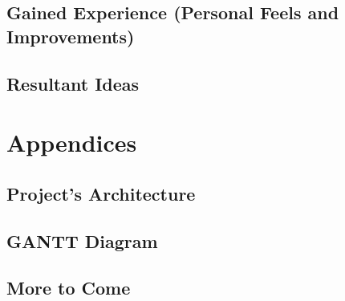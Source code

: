 \documentclass[a4paper,11pt,singlespacing]{article}
\begin{document}
    \subsection{Gained Experience (Personal Feels and Improvements)}
    \subsection{Resultant Ideas}

\section{Appendices}
    \subsection{Project's Architecture}
    \subsection{GANTT Diagram}
    \subsection{More to Come}
\end{document}
